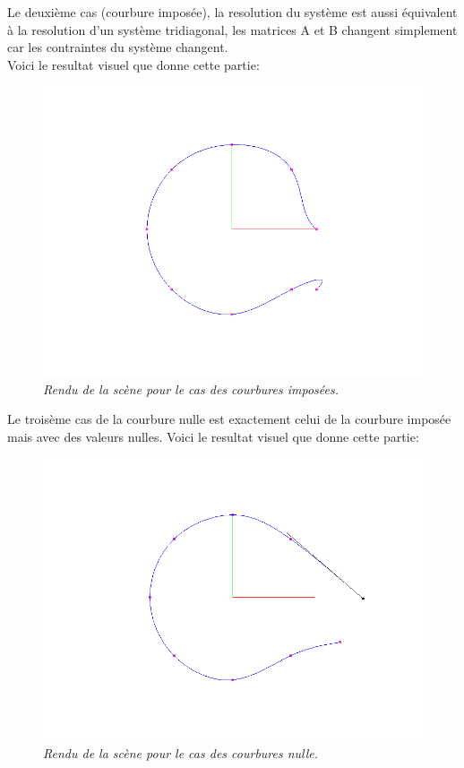 \documentclass[12pt,letterpaper]{article}
\begin{document}
	Le deuxième cas (courbure imposée), la resolution du système est aussi équivalent à la resolution d'un système tridiagonal, les matrices A et B changent simplement car les contraintes du système changent.\\
	Voici le resultat visuel que donne cette partie:
	\newpage
\begin{figure}[h!]
	\centering
	\includegraphics[scale=0.3]{images/imposedcurv.png}
	\caption{\textit{Rendu de la scène pour le cas des courbures imposées.}}
\end{figure}
	Le troisème cas de la courbure nulle est exactement celui de la courbure imposée mais avec des valeurs nulles.
	Voici le resultat visuel que donne cette partie:
\begin{figure}[h!]
	\centering
	\includegraphics[scale=0.3]{images/nilcurv.png}
	\caption{\textit{Rendu de la scène pour le cas des courbures nulle.}}
\end{figure}
\end{document}
